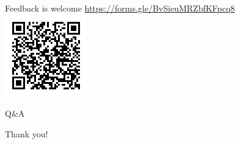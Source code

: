 \documentclass{beamer}
\begin{document}
\begin{frame}{Feedback is welcome}
  \url{https://forms.gle/BvSieuMRZbfKFpcq8}
  \includegraphics[width=\linewidth,height=0.75\textheight,keepaspectratio]{images/feedback.png}
\end{frame}

\begin{frame}{Q\&A}
  \begin{center}
Thank you!
  \end{center}
\end{frame}
\end{document}
